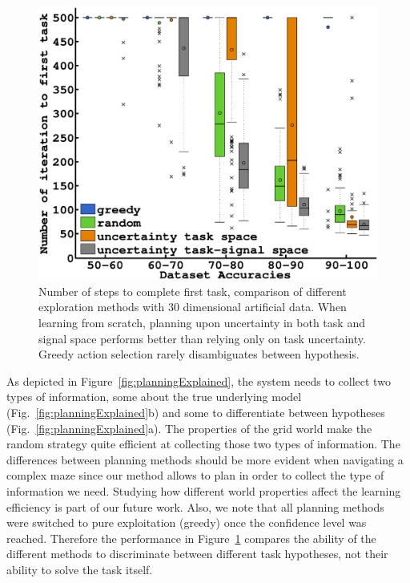 \begin{figure}[!ht]
  \centering
      \includegraphics[width=\columnwidth]{img/plots_aaai/plot_artificial_planning.eps}
      \caption{Number of steps to complete first task, comparison of different exploration methods with 30 dimensional artificial data. When learning from scratch, planning upon uncertainty in both task and signal space performs better than relying only on task uncertainty. Greedy action selection rarely disambiguates between hypothesis.}
    \label{fig:planning}
\end{figure}

As depicted in Figure~\ref{fig:planningExplained}, the system needs to collect two types of information, some about the true underlying model (Fig.~\ref{fig:planningExplained}b) and some to differentiate between hypotheses (Fig.~\ref{fig:planningExplained}a). The properties of the grid world make the random strategy quite efficient at collecting those two types of information. The differences between planning methods should be more evident when navigating a complex maze since our method allows to plan in order to collect the type of information we need. Studying how different world properties affect the learning efficiency is part of our future work. Also, we note that all planning methods were switched to pure exploitation (greedy) once the confidence level was reached. Therefore the performance in Figure~\ref{fig:planning} compares the ability of the different methods to discriminate between different task hypotheses, not their ability to solve the task itself.

